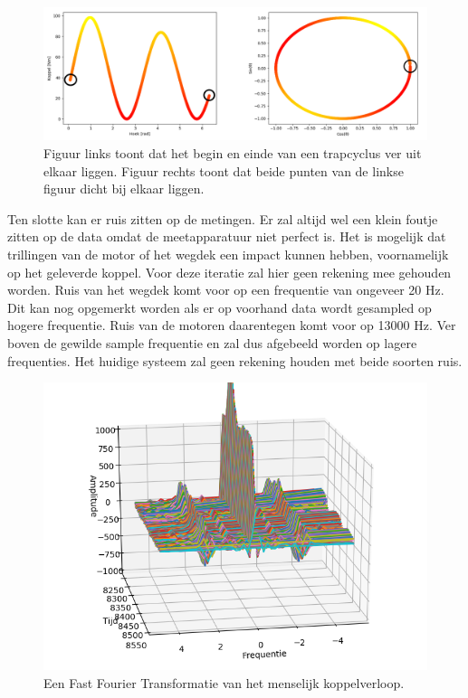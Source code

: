 \begin{figure}[h]
  \centering
  \includegraphics[width=\linewidth]{images/preprocessing-hoek.png}
  \caption{Figuur links toont dat het begin en einde van een trapcyclus ver uit elkaar liggen. Figuur rechts toont dat beide punten van de linkse figuur dicht bij elkaar liggen.}
  \label{fig:preprocessing hoek trapas}
\end{figure}

\noindent Ten slotte kan er ruis zitten op de metingen. Er zal altijd wel een klein foutje zitten op de data omdat de meetapparatuur niet perfect is. Het is mogelijk dat trillingen van de motor of het wegdek een impact kunnen hebben, voornamelijk op het geleverde koppel. Voor deze iteratie zal hier geen rekening mee gehouden worden. Ruis van het wegdek komt voor op een frequentie van ongeveer 20 Hz. Dit kan nog opgemerkt worden als er op voorhand data wordt gesampled op hogere frequentie. Ruis van de motoren daarentegen komt voor op 13000 Hz. Ver boven de gewilde sample frequentie en zal dus afgebeeld worden op lagere frequenties. Het huidige systeem zal geen rekening houden met beide soorten ruis. 

\begin{figure}[h]
  \centering
  \includegraphics[width=\linewidth]{images/fft_fietser.png}
  \caption{Een Fast Fourier Transformatie van het menselijk koppelverloop.}
  \label{fig:preprocessing hoek trapas}
\end{figure}

